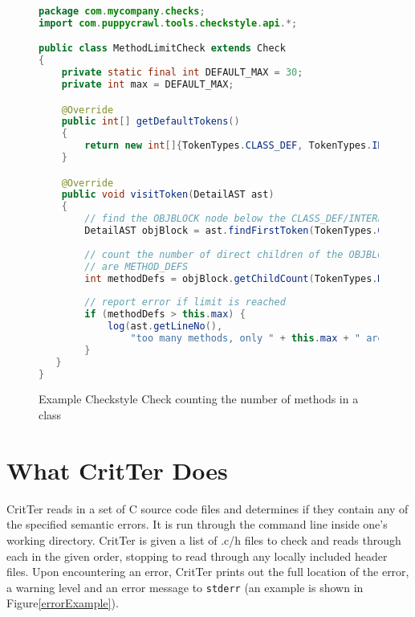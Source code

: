 \documentclass[12pt]{report}
\def\lstlistingname{Figure}
\newcommand{\refCode}{\lstlistingname \hspace{1mm}}
\newcommand{\programName}{CritTer\xspace}
\begin{document}
\begin{figure}
\caption[Example Checkstyle Check]{Example Checkstyle Check counting the number of methods in 
a class}
\label{checkstyle-rule}
\begin{lstlisting}[language=Java]
package com.mycompany.checks;
import com.puppycrawl.tools.checkstyle.api.*;

public class MethodLimitCheck extends Check
{
    private static final int DEFAULT_MAX = 30;
    private int max = DEFAULT_MAX;

    @Override
    public int[] getDefaultTokens()
    {
        return new int[]{TokenTypes.CLASS_DEF, TokenTypes.INTERFACE_DEF};
    }

    @Override
    public void visitToken(DetailAST ast)
    {
        // find the OBJBLOCK node below the CLASS_DEF/INTERFACE_DEF
        DetailAST objBlock = ast.findFirstToken(TokenTypes.OBJBLOCK);
        
        // count the number of direct children of the OBJBLOCK that 
        // are METHOD_DEFS
        int methodDefs = objBlock.getChildCount(TokenTypes.METHOD_DEF);
        
        // report error if limit is reached
        if (methodDefs > this.max) {
            log(ast.getLineNo(),
                "too many methods, only " + this.max + " are allowed");
        }
   }
}
\end{lstlisting}
\end{figure}

\chapter{What \programName Does}

\programName reads in a set of C source code files and determines if they contain any of the 
specified semantic errors. It is run through the command line inside one's 
working directory. \programName is given a list of .c/h files to check and reads through each in the 
given order, stopping to read through any locally included header files. Upon encountering an error,
\programName prints out the full location of the error, a warning level and an error message to 
\lstinline{stderr} (an example is shown in \refCode \ref{errorExample}). 
\end{document}
